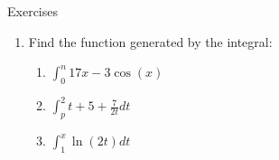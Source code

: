 \documentclass[../revisedmain.tex]{subfiles}
\begin{document}
	\begin{center}
		\LARGE Exercises
	\end{center}
	\begin{enumerate}
		\item Find the function generated by the integral:
		\begin{enumerate}
			\item $\int_{0}^{n}17x-3\cos(x)$
			\item $\int_{p}^{2}t+5+\frac{7}{2t}dt$
			\item $\int_{1}^{x}\ln(2t)dt$
		\end{enumerate}
	\end{enumerate}
\end{document}
